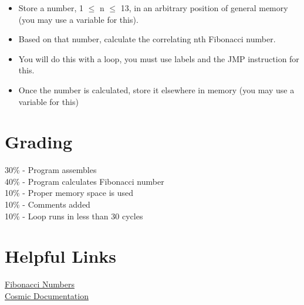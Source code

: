 \documentclass[
	12pt, %
]{fphw}
\begin{document}
\begin{itemize}
  \item Store a number, 1 $\leq$ n $\leq$ 13, in an arbitrary position of general memory (you may use a variable for this).
  \item Based on that number, calculate the correlating nth Fibonacci number.
  \item You will do this with a loop, you must use labels and the JMP instruction for this.
  \item Once the number is calculated, store it elsewhere in memory (you may use a variable for this)
\end{itemize}


\section*{Grading}

30\% - Program assembles\\
40\% - Program calculates Fibonacci number\\
10\% - Proper memory space is used\\
10\% - Comments added\\
10\%  - Loop runs in less than 30 cycles\\



\section*{Helpful Links}
\href{https://www.mathsisfun.com/numbers/fibonacci-sequence.html}{Fibonacci Numbers}\\
\href{https://github.com/clbx/Cosmic/tree/master/doc}{Cosmic Documentation}\\

\end{document}

